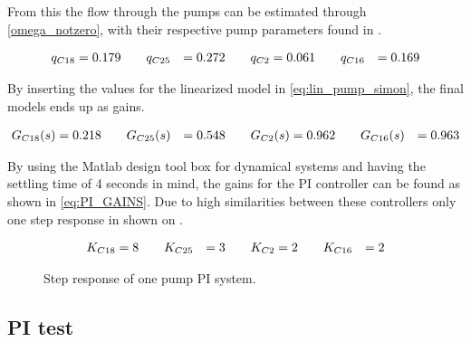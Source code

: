 From this the flow through the pumps can be estimated through \eqref{omega_notzero}, with their respective pump parameters found in .

\begin{equation}
\centering
\begin{split}
q_{C18} &= 0.179 \hspace{20pt} q_{C25} &= 0.272 \hspace{20pt} q_{C2} &= 0.061 \hspace{20pt} q_{C16} &= 0.169
\end{split}
\end{equation}

By inserting the values for the linearized model in \eqref{eq:lin_pump_simon}, the final models ends up as gains. 

\begin{equation}
\centering
	\begin{split}
	G_{C18}(s) &= 0.218 \hspace{20pt} G_{C25}(s) &= 0.548 \hspace{20pt} G_{C2}(s) &= 0.962 \hspace{20pt} G_{C16}(s) &= 0.963
	\end{split}
\end{equation}


By using the Matlab design tool box for dynamical systems and having the settling time of 4 seconds in mind, the gains for the PI controller can be found as shown in \eqref{eq:PI_GAINS}. 
Due to high similarities between these controllers only one step response in shown on .

\begin{equation}
\centering
	\begin{split}
	K_{C18} &= 8 \hspace{20pt} K_{C25} &= 3 \hspace{20pt} K_{C2} &= 2 \hspace{20pt} K_{C16} &= 2
	\end{split}
	\label{eq:NEW_PI_GAINS}
\end{equation}

\begin{figure}[H]
\centering

\caption{Step response of one pump PI system.}
\label{fig:Tikz_PI_PUMP_GAIN}
\end{figure}

\subsection*{PI test}

